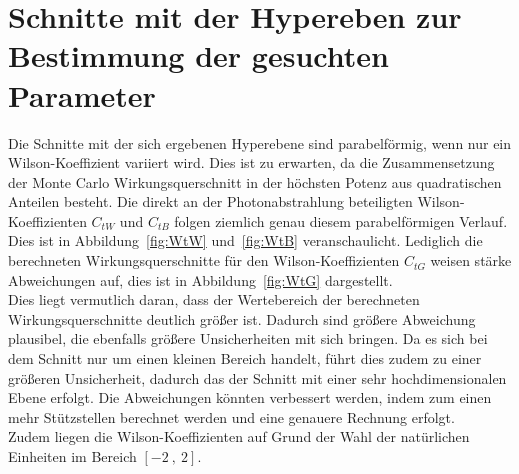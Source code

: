 \section{Schnitte mit der Hypereben zur Bestimmung der gesuchten Parameter}
Die Schnitte mit der sich ergebenen Hyperebene sind parabelförmig, wenn nur ein Wilson-Koeffizient variiert wird. Dies ist zu erwarten, da die Zusammensetzung der Monte Carlo Wirkungsquerschnitt in der höchsten Potenz aus quadratischen Anteilen besteht. Die direkt an der Photonabstrahlung beteiligten Wilson-Koeffizienten $C_{tW}$ und $C_{tB}$ folgen ziemlich genau diesem parabelförmigen Verlauf. Dies ist in Abbildung~\ref{fig:WtW} und~\ref{fig:WtB} veranschaulicht. Lediglich die berechneten Wirkungsquerschnitte für den Wilson-Koeffizienten $C_{tG}$ weisen stärke Abweichungen auf, dies ist in Abbildung~\ref{fig:WtG} dargestellt.\\
Dies liegt vermutlich daran, dass der Wertebereich der berechneten Wirkungsquerschnitte deutlich größer ist. Dadurch sind größere Abweichung plausibel, die ebenfalls größere Unsicherheiten mit sich bringen. Da es sich bei dem Schnitt nur um einen kleinen Bereich handelt, führt dies zudem zu einer größeren Unsicherheit, dadurch das der Schnitt mit einer sehr hochdimensionalen Ebene erfolgt. Die Abweichungen könnten verbessert werden, indem zum einen mehr Stützstellen berechnet werden  und eine genauere Rechnung erfolgt.\\
Zudem liegen die Wilson-Koeffizienten auf Grund der Wahl der natürlichen Einheiten im Bereich $[-2~,~2]$.
